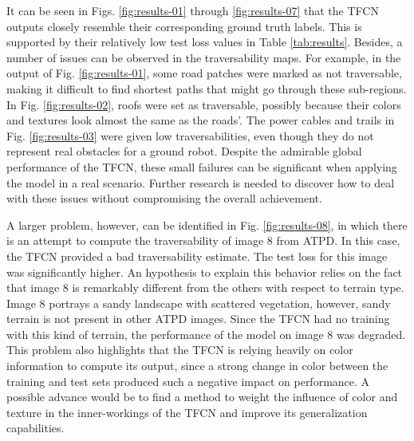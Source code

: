 \documentclass[conference]{IEEEtran}
\begin{document}
It can be seen in Figs. \ref{fig:results-01} through \ref{fig:results-07} that the TFCN outputs closely resemble their corresponding ground truth labels.
This is supported by their relatively low test loss values in Table \ref{tab:results}.
Besides, a number of issues can be observed in the traversability maps.
For example, in the output of Fig. \ref{fig:results-01}, some road patches were marked as not traversable, making it difficult to find shortest paths that might go through these sub-regions.
In Fig. \ref{fig:results-02}, roofs were set as traversable, possibly because their colors and textures look almost the same as the roads'.
The power cables and trails in Fig. \ref{fig:results-03} were given low traversabilities, even though they do not represent real obstacles for a ground robot.
Despite the admirable global performance of the TFCN, these small failures can be significant when applying the model in a real scenario.
Further research is needed to discover how to deal with these issues without compromising the overall achievement.

A larger problem, however, can be identified in Fig. \ref{fig:results-08}, in which there is an attempt to compute the traversability of image 8 from ATPD.
In this case, the TFCN provided a bad traversability estimate.
The test loss for this image was significantly higher.
An hypothesis to explain this behavior relies on the fact that image 8 is remarkably different from the others with respect to terrain type.
Image 8 portrays a sandy landscape with scattered vegetation, however, sandy terrain is not present in other ATPD images.
Since the TFCN had no training with this kind of terrain, the performance of the model on image 8 was degraded.
This problem also highlights that the TFCN is relying heavily on color information to compute its output, since a strong change in color between the training and test sets produced such a negative impact on performance.
A possible advance would be to find a method to weight the influence of color and texture in the inner-workings of the TFCN and improve its generalization capabilities.
\end{document}
